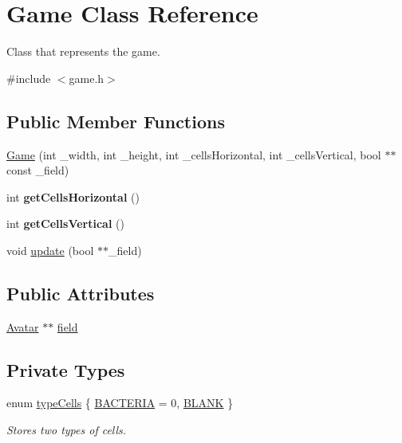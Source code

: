 \hypertarget{classGame}{}\section{Game Class Reference}
\label{classGame}


Class that represents the game.  




{\ttfamily \#include $<$game.\+h$>$}

\subsection*{Public Member Functions}
\begin{DoxyCompactItemize}
\item 
\hyperlink{classGame_a9bc2cfb647c51977a50006ac433511c7}{Game} (int \+\_\+width, int \+\_\+height, int \+\_\+cells\+Horizontal, int \+\_\+cells\+Vertical, bool $\ast$$\ast$const \+\_\+field)
\item 
int {\bfseries get\+Cells\+Horizontal} ()\hypertarget{classGame_ab191e9914c3b3b30162fb49b02d0bd36}{}\label{classGame_ab191e9914c3b3b30162fb49b02d0bd36}

\item 
int {\bfseries get\+Cells\+Vertical} ()\hypertarget{classGame_a6ddb90d54f45464e9a80a9ab6501ccb1}{}\label{classGame_a6ddb90d54f45464e9a80a9ab6501ccb1}

\item 
void \hyperlink{classGame_af6fd557aa9a11e04b8d94b6c35996a60}{update} (bool $\ast$$\ast$\+\_\+field)
\end{DoxyCompactItemize}
\subsection*{Public Attributes}
\begin{DoxyCompactItemize}
\item 
\hyperlink{classAvatar}{Avatar} $\ast$$\ast$ \hyperlink{classGame_a0397b9eb4da1907b4de83b7e450fe1ea}{field}
\end{DoxyCompactItemize}
\subsection*{Private Types}
\begin{DoxyCompactItemize}
\item 
enum \hyperlink{classGame_a15939429a3b6e3f068272c60a885e809}{type\+Cells} \{ \hyperlink{classGame_a15939429a3b6e3f068272c60a885e809a602b1a4e95398f98e6d7657bd8a281a3}{B\+A\+C\+T\+E\+R\+IA} = 0, 
\hyperlink{classGame_a15939429a3b6e3f068272c60a885e809a2231bae51b3df1e74da8ba0400d18a91}{B\+L\+A\+NK}
 \}\begin{DoxyCompactList}\small\item\em Stores two types of cells. \end{DoxyCompactList}
\end{DoxyCompactItemize}
